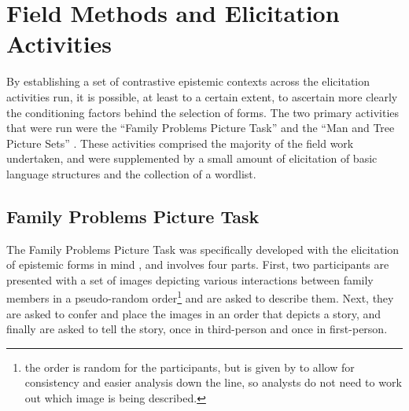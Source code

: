 \section{Field Methods and Elicitation Activities}
By establishing a set of contrastive epistemic contexts across the elicitation activities run, it is possible, at least to a certain extent, to ascertain more clearly the conditioning factors behind the selection of forms. The two primary activities that were run were the ``Family Problems Picture Task'' \cite{SanRoque2012a} and the ``Man and Tree Picture Sets'' \cite{Levinson1992}. These activities comprised the majority of the field work undertaken, and were supplemented by a small amount of elicitation of basic language structures and the collection of a wordlist.

\subsection{Family Problems Picture Task}\label{p:Methods:FamilyProblems}
The Family Problems Picture Task was specifically developed with the elicitation of epistemic forms in mind \cite{SanRoque2012a}, and involves four parts. First, two participants are presented with a set of images \cite{Carroll2009} depicting various interactions between family members in a pseudo-random order\footnote{the order is random for the participants, but is given by  to allow for consistency and easier analysis down the line, so analysts do not need to work out which image is being described.} and are asked to describe them. Next, they are asked to confer and place the images in an order that depicts a story, and finally are asked to tell the story, once in third-person and once in first-person.

